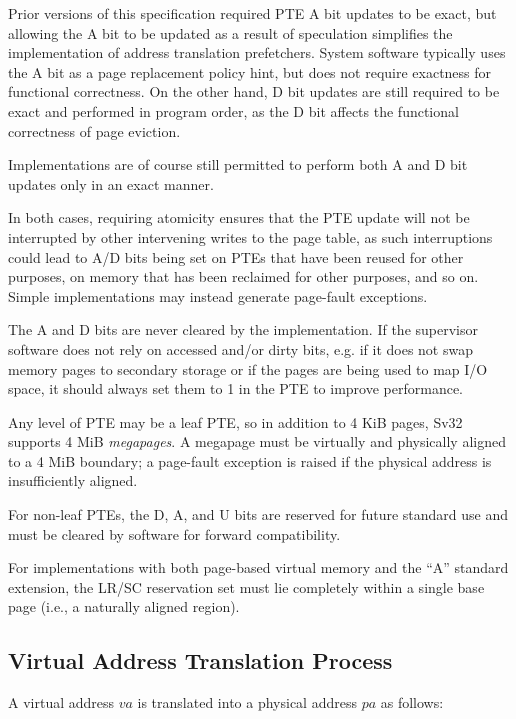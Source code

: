\begin{commentary}
Prior versions of this specification required PTE A bit updates to be exact,
but allowing the A bit to be updated as a result of speculation simplifies
the implementation of address translation prefetchers.  System software
typically uses the A bit as a page replacement policy hint, but does not
require exactness for functional correctness.  On the other hand, D bit updates
are still required to be exact and performed in program order, as the D bit
affects the functional correctness of page eviction.

Implementations are of course still permitted to perform both A and D bit
updates only in an exact manner.

In both cases, requiring atomicity ensures that the PTE update will not be
interrupted by other intervening writes to the page table, as such interruptions
could lead to A/D bits being set on PTEs that have been reused for other
purposes, on memory that has been reclaimed for other purposes, and so on.
Simple implementations may instead generate page-fault exceptions.

The A and D bits are never cleared by the implementation.  If the
supervisor software does not rely on accessed and/or dirty bits,
e.g. if it does not swap memory pages to secondary storage or if the
pages are being used to map I/O space, it should always set them to 1
in the PTE to improve performance.
\end{commentary}

Any level of PTE may be a leaf PTE, so in addition to 4 KiB pages, Sv32
supports 4 MiB {\em megapages}.  A megapage must be virtually and
physically aligned to a 4 MiB boundary; a page-fault exception is raised
if the physical address is insufficiently aligned.

For non-leaf PTEs, the D, A, and U bits are reserved for future standard use and
must be cleared by software for forward compatibility.

For implementations with both page-based virtual memory and the ``A'' standard
extension, the LR/SC reservation set must lie completely within a single
base page (i.e., a naturally aligned  region).

\subsection{Virtual Address Translation Process}
\label{sv32algorithm}

A virtual address $va$ is translated into a physical address $pa$ as
follows:

